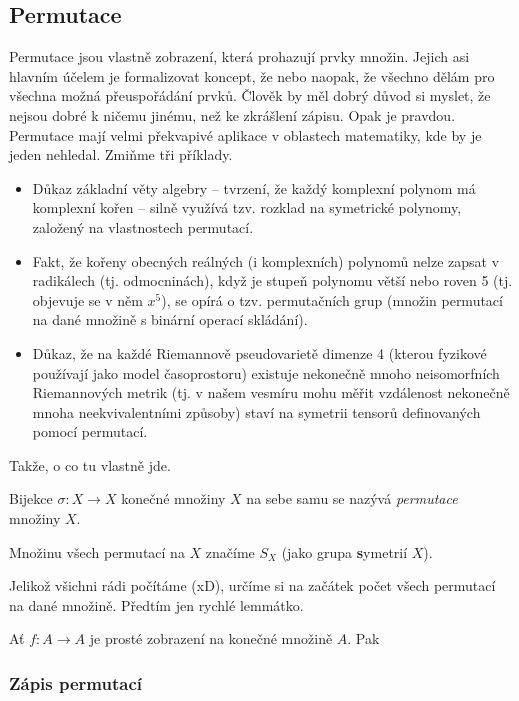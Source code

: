 \subsection{Permutace}
\label{ssec:permutace}

Permutace jsou vlastně zobrazení, která prohazují prvky množin. Jejich asi
hlavním účelem je formalizovat koncept, že  nebo naopak,
že všechno dělám pro všechna možná přeuspořádání prvků. Člověk by měl dobrý
důvod si myslet, že nejsou dobré k ničemu jinému, než ke zkrášlení zápisu. Opak
je pravdou. Permutace mají velmi překvapivé aplikace v oblastech matematiky, kde
by je jeden nehledal. Zmiňme tři příklady.
\begin{itemize}
 \item Důkaz základní věty algebry -- tvrzení, že každý komplexní polynom má
  komplexní kořen -- silně využívá tzv. rozklad na symetrické polynomy, založený
  na vlastnostech permutací.
 \item Fakt, že kořeny obecných reálných (i komplexních) polynomů nelze zapsat v
  radikálech (tj. odmocninách), když je stupeň polynomu větší nebo roven 5 (tj.
  objevuje se v něm $x^{5}$), se opírá o tzv.  permutačních
  grup (množin permutací na dané množině s binární operací skládání).
 \item Důkaz, že na každé Riemannově pseudovarietě dimenze 4 (kterou fyzikové
  používají jako model časoprostoru) existuje nekonečně mno\-ho neisomorfních
  Riemannových metrik (tj. v našem vesmíru mohu měřit vzdálenost nekonečně mnoha
  neekvivalentními způsoby) staví na symetrii tensorů definovaných pomocí
  permutací.
\end{itemize}

Takže, o co tu vlastně jde.
\begin{definition}[Permutace]
 \label{def:permutace}
 Bijekce $\sigma:X \to X$ konečné množiny $X$ na sebe samu se nazývá
 \emph{permutace} množiny $X$.

 Množinu všech permutací na $X$ značíme $S_X$ (jako grupa \textbf{s}ymetrií
 $X$). 
\end{definition}

Jelikož všichni rádi počítáme (xD), určíme si na začátek počet všech permutací
na dané množině. Předtím jen rychlé lemmátko.
\begin{lemma}
 Ať $f:A \to A$ je prosté zobrazení na konečné množině $A$. Pak 
\end{lemma}

\subsubsection{Zápis permutací}
\label{sssec:zapis-permutaci}

